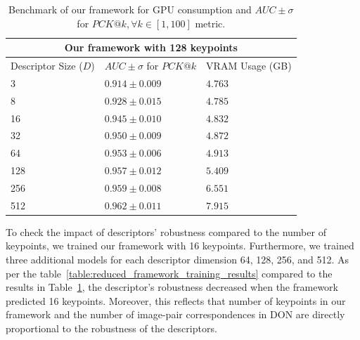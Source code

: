 \begin{table}[htb]
    \caption{Benchmark of our framework for GPU consumption and $AUC \pm \sigma$ for $PCK@k,  \forall k \in [1, 100]$ metric.}
    \label{table:framework_training_results}
    \centering
    \begin{tabular}{lll}
        \toprule
        \multicolumn{3}{c}{Our framework with 128 keypoints}                   \\
        \midrule
        Descriptor Size ($D$) & $AUC \pm \sigma$ for $PCK@k$ & VRAM Usage (GB) \\ \hline
        3                     & $0.914 \pm 0.009$            & $4.763$         \\
        8                     & $0.928 \pm 0.015$            & $4.785 $        \\
        16                    & $0.945 \pm 0.010$            & $4.832 $        \\
        32                    & $0.950 \pm 0.009$            & $4.872 $        \\
        64                    & $0.953 \pm 0.006$            & $4.913 $        \\
        128                   & $0.957 \pm 0.012$            & $5.409 $        \\
        256                   & $0.959 \pm 0.008$            & $6.551 $        \\
        512                   & $0.962 \pm 0.011$            & $7.915 $        \\
        \bottomrule
    \end{tabular}
\end{table}

To check the impact of descriptors' robustness compared to the number of keypoints, we trained our framework with 16 keypoints.
Furthermore, we trained three additional models for each descriptor dimension 64, 128, 256, and 512.
As per the table~\ref{table:reduced_framework_training_results} compared to the results in Table~\ref{table:framework_training_results},
the descriptor's robustness decreased when the framework predicted 16 keypoints.
Moreover, this reflects that number of keypoints in our framework and the number of image-pair correspondences in DON are directly proportional to the robustness of the descriptors.

